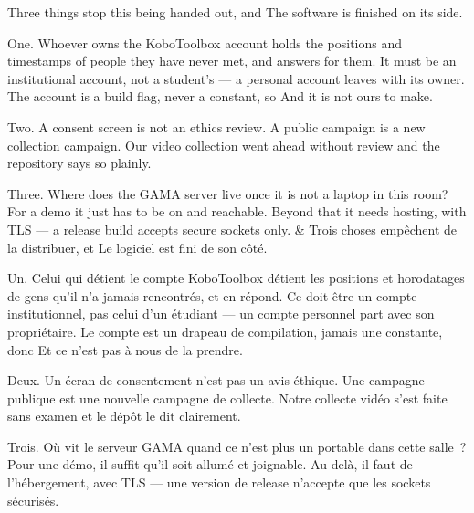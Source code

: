 \documentclass[10pt,a4paper]{article}
\begin{document}
\begin{say}
Three things stop this being handed out, and  The
software is finished on its side.

One. Whoever owns the KoboToolbox account holds the positions and timestamps of
people they have never met, and answers for them. It must be an institutional
account, not a student's --- a personal account leaves with its owner. The account
is a build flag, never a constant, so  And it is not ours to make.

Two. A consent screen is not an ethics review. A public campaign is a new
collection campaign. Our video collection went ahead without review and the
repository says so plainly. 

Three. Where does the GAMA server live once it is not a laptop in this room? For a
demo it just has to be on and reachable. Beyond that it needs hosting, with TLS
--- a release build accepts secure sockets only.
&
Trois choses empêchent de la distribuer, et  Le logiciel
est fini de son côté.

Un. Celui qui détient le compte KoboToolbox détient les positions et horodatages de
gens qu'il n'a jamais rencontrés, et en répond. Ce doit être un compte
institutionnel, pas celui d'un étudiant --- un compte personnel part avec son
propriétaire. Le compte est un drapeau de compilation, jamais une constante, donc
 Et ce n'est pas à nous de la
prendre.

Deux. Un écran de consentement n'est pas un avis éthique. Une campagne publique est
une nouvelle campagne de collecte. Notre collecte vidéo s'est faite sans examen et
le dépôt le dit clairement. 

Trois. Où vit le serveur GAMA quand ce n'est plus un portable dans cette salle~?
Pour une démo, il suffit qu'il soit allumé et joignable. Au-delà, il faut de
l'hébergement, avec TLS --- une version de release n'accepte que les sockets
sécurisés.
\end{say}

\clearpage
\end{document}

